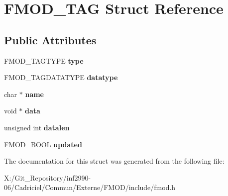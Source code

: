 \hypertarget{struct_f_m_o_d___t_a_g}{\section{F\-M\-O\-D\-\_\-\-T\-A\-G Struct Reference}
\label{struct_f_m_o_d___t_a_g}
}
\subsection*{Public Attributes}
\begin{DoxyCompactItemize}
\item 
\hypertarget{struct_f_m_o_d___t_a_g_ad891c5f78e72ffeebc0f39e34e5b1b20}{F\-M\-O\-D\-\_\-\-T\-A\-G\-T\-Y\-P\-E {\bfseries type}}\label{struct_f_m_o_d___t_a_g_ad891c5f78e72ffeebc0f39e34e5b1b20}

\item 
\hypertarget{struct_f_m_o_d___t_a_g_acc0f4bf92ee045d5828ba7eccc3c4c23}{F\-M\-O\-D\-\_\-\-T\-A\-G\-D\-A\-T\-A\-T\-Y\-P\-E {\bfseries datatype}}\label{struct_f_m_o_d___t_a_g_acc0f4bf92ee045d5828ba7eccc3c4c23}

\item 
\hypertarget{struct_f_m_o_d___t_a_g_a200d18627ec871638bb7df841a77b2ab}{char $\ast$ {\bfseries name}}\label{struct_f_m_o_d___t_a_g_a200d18627ec871638bb7df841a77b2ab}

\item 
\hypertarget{struct_f_m_o_d___t_a_g_a86247271797eb33118a5fff813c1e548}{void $\ast$ {\bfseries data}}\label{struct_f_m_o_d___t_a_g_a86247271797eb33118a5fff813c1e548}

\item 
\hypertarget{struct_f_m_o_d___t_a_g_a589281f4f1adc717798744722ec43761}{unsigned int {\bfseries datalen}}\label{struct_f_m_o_d___t_a_g_a589281f4f1adc717798744722ec43761}

\item 
\hypertarget{struct_f_m_o_d___t_a_g_a0358f4afc9957d3d3254691c3118d90a}{F\-M\-O\-D\-\_\-\-B\-O\-O\-L {\bfseries updated}}\label{struct_f_m_o_d___t_a_g_a0358f4afc9957d3d3254691c3118d90a}

\end{DoxyCompactItemize}


The documentation for this struct was generated from the following file\-:\begin{DoxyCompactItemize}
\item 
X\-:/\-Git\-\_\-\-Repository/inf2990-\/06/\-Cadriciel/\-Commun/\-Externe/\-F\-M\-O\-D/include/fmod.\-h\end{DoxyCompactItemize}
